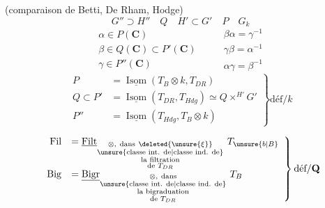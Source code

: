 (comparaison de Betti, De Rham, Hodge)
\[
G''\supset H''\quad Q\quad H'\subset G'\quad P\quad G_k
\]
\[
\boxed{\begin{array}{l}
\alpha\in P(\mathbf C)\\
\beta\in Q(\mathbf C)\subset P'(\mathbf C)\\
\gamma\in P''(\mathbf C)
\end{array}}
\qquad
\begin{array}{l}
\beta\alpha=\gamma^{-1}\\
\gamma\beta=\alpha^{-1}\\
\alpha\gamma=\beta^{-1}
\end{array}
\]
\[
\left.\begin{array}{rl}
P&=\underline{\operatorname{Isom}}(T_B\otimes k,T_{DR})\\
Q\subset P'&=\underline{\operatorname{Isom}}(T_{DR},T_{Hdg})\simeq Q\mathbin{\times^{H'}}G'\\
P''&=\underline{\operatorname{Isom}}(T_{Hdg},T_B\otimes k)
\end{array}\right\}\text{déf}/k
\]

\[
\left.\begin{array}{rl}
\mathrm{Fil}&=\underline{\operatorname{Filt}}_{\substack{\otimes,\ \text{dans}\ \deleted{\unsure{\xi}}\\\unsure{\text{classe int. de}|\text{classe ind. de}}\\\text{la filtration}\\\text{de }T_{DR}}}\ T_{\unsure{b|B}}\\[2em]
\mathrm{Big}&=\underline{\operatorname{Bigr}}_{\substack{\otimes,\ \text{dans}\\\unsure{\text{classe int. de}|\text{classe ind. de}}\\\text{la bigraduation}\\\text{de }T_{DR}}}\ T_B
\end{array}\right\}\text{déf}/\mathbf Q
\]


